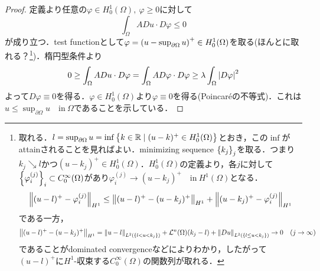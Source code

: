 \documentclass[a4paper]{ltjsarticle}
\newcommand{\Rset}{\mathbb{R}}
\newcommand{\Om}{\Omega}
\newcommand{\pOm}{\partial\Omega}
\newcommand{\Lm}{\mathcal{L}}
\newcommand{\inn}{\quad\text{in}\ }
\newcommand{\1}{\mathbbm{1}}
\numberwithin{equation}{section}
\theoremstyle{definition}
\begin{document}
\begin{proof}
    定義より任意の$\varphi\in H^1_0(\Om),\ \varphi\geq0$に対して
    \begin{equation}
        \int_{\Om}ADu\cdot D\varphi\leq 0 
    \end{equation}
    が成り立つ．test functionとして$\varphi=\qty(u-\sup_{\pOm}u)^+\in H^1_0(\Om)$を取る(ほんとに取れる？\footnote{取れる．$l=\sup_{\pOm}u=\inf\qty{k\in \Rset\mid (u-k)^+\in H^1_0(\Om)}$とおき，この$\inf$がattainされることを見ればよい．minimizing sequence $\qty{k_j}_j$を取る．つまり$k_j\searrow l$かつ$(u-k_j)^+\in H^1_0(\Om)$．$H^1_0(\Om)$の定義より，各$j$に対して$\qty{\varphi^{(j)}_i}_i\subset C^\infty_0(\Om)$があり$\varphi^{(j)}_i\to (u-k_j)^+\inn H^1(\Om)$となる．
    \begin{equation}
        \norm{(u-l)^+ - \varphi^{(j)}_i}_{H^1}\leq \norm{(u-l)^+ - (u-k_j)^+}_{H^1}+\norm{(u-k_j)^+ - \varphi^{(j)}_i}_{H^1}
    \end{equation}
    である一方，
    \begin{equation}
        \norm{(u-l)^+ - (u-k_j)^+}_{H^1}=\norm{u-l}_{L^2\qty(\qty{l<u<k_j})}+\Lm^n(\Om)(k_j-l)+\norm{Du}_{L^2\qty(\qty{l\leq u<k_j})}\to 0\quad (j\to\infty) 
    \end{equation}
    であることがdominated convergenceなどによりわかり，したがって$(u-l)^+$に$H^1$-収束する$C^\infty_0(\Om)$の関数列が取れる．})．楕円型条件より
    \begin{equation}
        0\geq \int_{\Om}ADu\cdot D\varphi=\int_{\Om}AD\varphi\cdot D\varphi\geq \lambda \int_{\Om}\abs{D\varphi}^2
    \end{equation}
    よって$D\varphi\equiv 0$を得る．$\varphi\in H^1_0(\Om)$より$\varphi\equiv0$を得る(Poincaréの不等式)．これは$u\leq \sup_{\pOm}u\inn\Om$であることを示している．
\end{proof}
\end{document}
